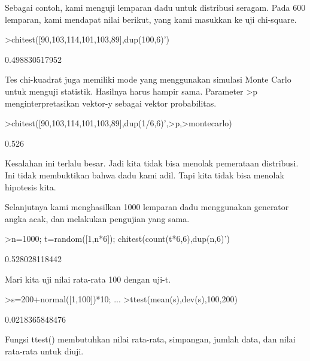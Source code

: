 \documentclass[a4paper,10pt]{article}
\begin{document}
\begin{eulernotebook}
\begin{eulercomment}
\begin{eulercomment}
\begin{eulercomment}
\begin{eulercomment}
\begin{eulercomment}
\begin{eulercomment}
\begin{eulercomment}
\begin{eulercomment}
\begin{eulercomment}
\begin{eulercomment}
\begin{eulercomment}
\begin{eulercomment}
\begin{eulercomment}
\begin{eulercomment}
\begin{eulercomment}
\begin{eulercomment}
\begin{eulercomment}
\begin{eulercomment}
\begin{eulercomment}
Sebagai contoh, kami menguji lemparan dadu untuk distribusi seragam.
Pada 600 lemparan, kami mendapat nilai berikut, yang kami masukkan ke
uji chi-square.
\end{eulercomment}
\begin{eulerprompt}
>chitest([90,103,114,101,103,89],dup(100,6)')
\end{eulerprompt}
\begin{euleroutput}
  0.498830517952
\end{euleroutput}
\begin{eulercomment}
Tes chi-kuadrat juga memiliki mode yang menggunakan simulasi Monte
Carlo untuk menguji statistik. Hasilnya harus hampir sama. Parameter
\textgreater{}p menginterpretasikan vektor-y sebagai vektor probabilitas.
\end{eulercomment}
\begin{eulerprompt}
>chitest([90,103,114,101,103,89],dup(1/6,6)',>p,>montecarlo)
\end{eulerprompt}
\begin{euleroutput}
  0.526
\end{euleroutput}
\begin{eulercomment}
Kesalahan ini terlalu besar. Jadi kita tidak bisa menolak pemerataan
distribusi. Ini tidak membuktikan bahwa dadu kami adil. Tapi kita
tidak bisa menolak hipotesis kita.

Selanjutnya kami menghasilkan 1000 lemparan dadu menggunakan generator
angka acak, dan melakukan pengujian yang sama.
\end{eulercomment}
\begin{eulerprompt}
>n=1000; t=random([1,n*6]); chitest(count(t*6,6),dup(n,6)')
\end{eulerprompt}
\begin{euleroutput}
  0.528028118442
\end{euleroutput}
\begin{eulercomment}
Mari kita uji nilai rata-rata 100 dengan uji-t.
\end{eulercomment}
\begin{eulerprompt}
>s=200+normal([1,100])*10; ...
>ttest(mean(s),dev(s),100,200)
\end{eulerprompt}
\begin{euleroutput}
  0.0218365848476
\end{euleroutput}
\begin{eulercomment}
Fungsi ttest() membutuhkan nilai rata-rata, simpangan, jumlah data,
dan nilai rata-rata untuk diuji.


\end{eulercomment}
\end{eulercomment}
\end{eulercomment}
\end{eulercomment}
\end{eulercomment}
\end{eulercomment}
\end{eulercomment}
\end{eulercomment}
\end{eulercomment}
\end{eulercomment}
\end{eulercomment}
\end{eulercomment}
\end{eulercomment}
\end{eulercomment}
\end{eulercomment}
\end{eulercomment}
\end{eulercomment}
\end{eulercomment}
\end{eulercomment}
\end{eulernotebook}
\end{document}
